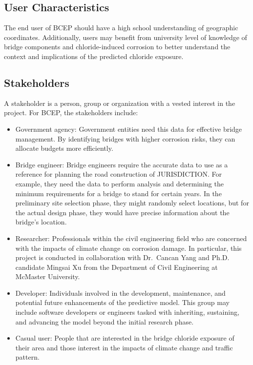 \documentclass[12pt]{article}
\begin{document}
\subsection{User Characteristics} \label{SecUserCharacteristics}
The end user of BCEP should have a high school understanding of geographic coordinates. Additionally, users may benefit from university level of knowledge of bridge components and chloride-induced corrosion to better understand the context and implications of the predicted chloride exposure.

\subsection{Stakeholders} \label{Stakeholders}
 A stakeholder is a person, group or organization with a vested interest in the project. For BCEP, the stakeholders include:

\begin{itemize}
\item Government agency: Government entities need this data for effective bridge management. By identifying bridges with higher corrosion risks, they can allocate budgets more efficiently.
\item Bridge engineer: Bridge engineers require the accurate data to use as a reference for planning the road construction of JURISDICTION. For example, they need the data to perform analysis and determining the minimum requirements for a bridge to stand for certain years. In the preliminary site selection phase, they might randomly select locations, but for the actual design phase, they would have precise information about the bridge’s location.
\item Researcher: Professionals within the civil engineering field who are concerned with the impacts of climate change on corrosion damage. In particular, this project is conducted in collaboration with Dr.~Cancan Yang and Ph.D. candidate Mingsai Xu from the Department of Civil Engineering at McMaster University.
\item Developer: Individuals involved in the development, maintenance, and potential future enhancements of the predictive model. This group may include software developers or engineers tasked with inheriting, sustaining, and advancing the model beyond the initial research phase.
\item Casual user: People that are interested in the bridge chloride exposure of their area and those interest in the impacts of climate change and traffic pattern. 
\end{itemize}
\end{document}
